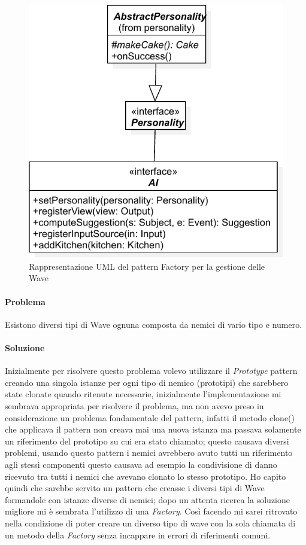 \documentclass[a4paper,12pt]{report}
\begin{document}
\begin{figure}[H]
\centering{}
\includegraphics[width=\textwidth]{img/strategy}
\caption{Rappresentazione UML del pattern Factory per la gestione delle Wave}
\label{img:strategy}
\end{figure}

\paragraph{Problema} Esistono diversi tipi di Wave ognuna composta da nemici di vario tipo e numero.

\paragraph{Soluzione} Inizialmente per risolvere questo problema volevo utilizzare il \textit{Prototype} pattern creando una singola istanze per ogni tipo di nemico (prototipi) che sarebbero state clonate quando ritenute necessarie, inizialmente l’implementazione mi sembrava appropriata per risolvere il problema, ma non avevo preso in considerazione un problema fondamentale del pattern, infatti il metodo clone() che applicava il pattern non creava mai una nuova istanza ma passava solamente un riferimento del prototipo su cui era stato chiamato; questo causava diversi problemi, usando questo pattern i nemici avrebbero avuto tutti un riferimento agli stessi componenti questo causava ad esempio la condivisione di danno ricevuto tra tutti i nemici che avevano clonato lo stesso prototipo.
Ho capito quindi che sarebbe servito un pattern che creasse i diversi tipi di Wave formandole con istanze diverse di nemici; dopo un attenta ricerca la soluzione migliore mi è sembrata l’utilizzo di una \textit{Factory}. Così facendo mi sarei ritrovato nella condizione di poter creare un diverso tipo di wave con la sola chiamata di un metodo della \textit{Factory} senza incappare in errori di riferimenti comuni.
\end{document}
